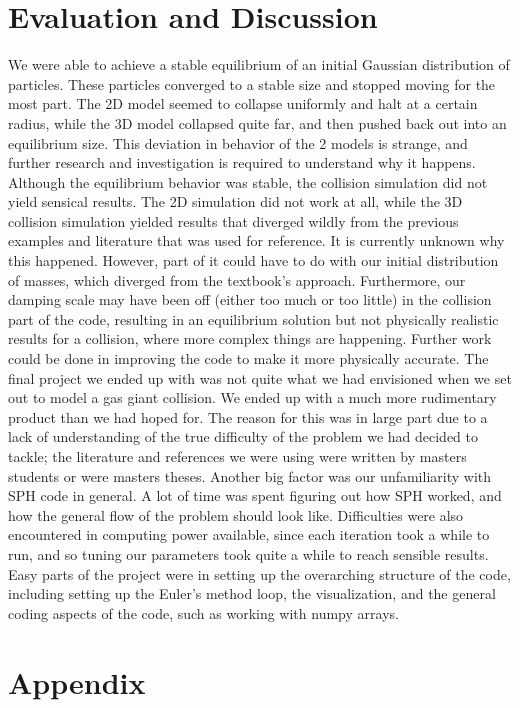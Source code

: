 \documentclass[12pt]{article}
\begin{document}
\section{Evaluation and Discussion}
We were able to achieve a stable equilibrium of an initial Gaussian distribution of particles. These particles converged to a stable size and stopped moving for the most part. The 2D model seemed to collapse uniformly and halt at a certain radius, while the 3D model collapsed quite far, and then pushed back out into an equilibrium size. This deviation in behavior of the 2 models is strange, and further research and investigation is required to understand why it happens. Although the equilibrium behavior was stable, the collision simulation did not yield sensical results. The 2D simulation did not work at all, while the 3D collision simulation yielded results that diverged wildly from the previous examples and literature that was used for reference. It is currently unknown why this happened. However, part of it could have to do with our initial distribution of masses, which diverged from the textbook's approach. Furthermore, our damping scale may have been off (either too much or too little) in the collision part of the code, resulting in an equilibrium solution but not physically realistic results for a collision, where more complex things are happening. Further work could be done in improving the code to make it more physically accurate.
\newline\indent
The final project we ended up with was not quite what we had envisioned when we set out to model a gas giant collision. We ended up with a much more rudimentary product than we had hoped for. The reason for this was in large part due to a lack of understanding of the true difficulty of the problem we had decided to tackle; the literature and references we were using were written by masters students or were masters theses. Another big factor was our unfamiliarity with SPH code in general. A lot of time was spent figuring out how SPH worked, and how the general flow of the problem should look like. Difficulties were also encountered in computing power available, since each iteration took a while to run, and so tuning our parameters took quite a while to reach sensible results. Easy parts of the project were in setting up the overarching structure of the code, including setting up the Euler's method loop, the visualization, and the general coding aspects of the code, such as working with numpy arrays. 
\bigskip

\section{Appendix}
\end{document}
